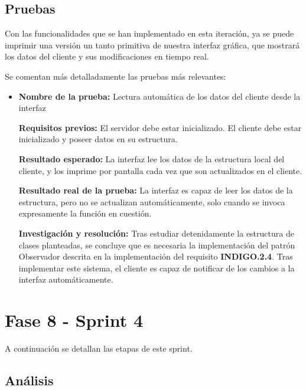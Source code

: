 \subsection{Pruebas}

Con las funcionalidades que se han implementado en esta iteración, ya se puede imprimir una versión un tanto primitiva de nuestra interfaz gráfica, que mostrará los datos del cliente y sus modificaciones en tiempo real. 

Se comentan más detalladamente las pruebas más relevantes:

\begin{itemize}
	\item \textbf{Nombre de la prueba:} Lectura automática de los datos del cliente desde la interfaz
	
\textbf{Requisitos previos:} El servidor debe estar inicializado. El cliente debe estar inicializado y poseer datos en su estructura. 

\textbf{Resultado esperado:} La interfaz lee los datos de la estructura local del cliente, y los imprime por pantalla cada vez que son actualizados en el cliente.

\textbf{Resultado real de la prueba:} La interfaz es capaz de leer los datos de la estructura, pero no se actualizan automáticamente, solo cuando se invoca expresamente la función en cuestión.

\textbf{Investigación y resolución:} Tras estudiar detenidamente la estructura de clases planteadas, se concluye que es necesaria la implementación del patrón Observador descrita en la implementación del requisito \textbf{INDIGO.2.4}. Tras implementar este sistema, el cliente es capaz de notificar de los cambios a la interfaz automáticamente.

\end{itemize}


\newpage

\section{Fase 8 - Sprint 4}

A continuación se detallan las etapas de este sprint.

\subsection{Análisis}


